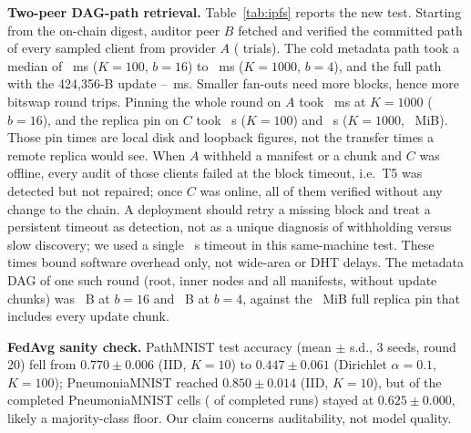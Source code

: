 \documentclass[final,3p,times,twocolumn]{elsarticle}
\begin{document}
\textbf{Two-peer DAG-path retrieval.}\label{sec:ipfs} Table~\ref{tab:ipfs} reports the new test. Starting from the on-chain digest, auditor peer $B$ fetched and verified the committed path of every sampled client from provider $A$ ( trials). The cold metadata path took a median of ~ms ($K=100$, $b=16$) to ~ms ($K=1000$, $b=4$), and the full path with the 424,356-B update --~ms. Smaller fan-outs need more blocks, hence more bitswap round trips. Pinning the whole round on $A$ took ~ms at $K=1000$ ($b=16$), and the replica pin on $C$ took ~s ($K=100$) and ~s ($K=1000$, ~MiB). Those pin times are local disk and loopback figures, not the transfer times a remote replica would see. When $A$ withheld a manifest or a chunk and $C$ was offline, every audit of those clients failed at the block timeout, i.e.\ T5 was detected but not repaired; once $C$ was online, all of them verified without any change to the chain. A deployment should retry a missing block and treat a persistent timeout as detection, not as a unique diagnosis of withholding versus slow discovery; we used a single ~s timeout in this same-machine test. These times bound software overhead only, not wide-area or DHT delays. The metadata DAG of one such round (root, inner nodes and all manifests, without update chunks) was ~B at $b=16$ and ~B at $b=4$, against the ~MiB full replica pin that includes every update chunk.

\textbf{FedAvg sanity check.} PathMNIST test accuracy (mean $\pm$ s.d., 3 seeds, round 20) fell from $0.770\pm0.006$ (IID, $K=10$) to $0.447\pm0.061$ (Dirichlet $\alpha=0.1$, $K=100$); PneumoniaMNIST reached $0.850\pm0.014$ (IID, $K=10$), but  of the  completed PneumoniaMNIST cells ( of  completed runs) stayed at $0.625\pm0.000$, likely a majority-class floor. Our claim concerns auditability, not model quality.
\end{document}
